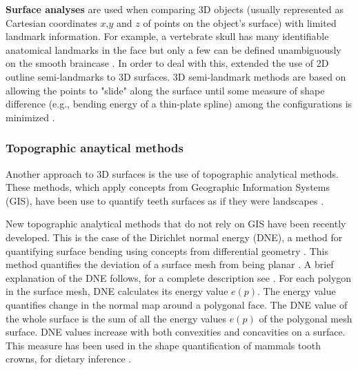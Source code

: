 \textbf{Surface analyses} are used when comparing 3D objects (usually represented as Cartesian coordinates $x$,$y$ and $z$ of points on the object's surface) with limited landmark information. For example, a vertebrate skull has many identifiable anatomical landmarks in the face but only a few can be defined unambiguously on the smooth braincase \citep{Mitteroecker2009}. In order to deal with this, \citealp{Gunz2005} extended the use of 2D outline semi-landmarks to 3D surfaces. 3D semi-landmark methods are based on allowing the points to "slide" along the surface until some measure of shape difference (e.g., bending energy of a thin-plate spline) among the configurations is minimized \citep{Mitteroecker2009}.


\subsubsection{Topographic anaytical methods}
\label{DNE_explanation}

Another approach to 3D surfaces is the use of topographic analytical methods. These methods, which apply concepts from Geographic Information Systems (GIS), have been use to quantify teeth surfaces as if they were landscapes \citep{jernvall1999laser,Winchester2014}.  

New topographic analytical methods that do not rely on GIS have been recently developed. This is the case of the Dirichlet normal energy (DNE), a method for quantifying surface bending using concepts from differential geometry \citep{Bunn2011}. This method quantifies the deviation of a surface mesh from being planar \citep{Bunn2011}. A brief explanation of the DNE follows, for a complete description see \citep{Bunn2011,Winchester2016}. For each polygon in the surface mesh, DNE calculates its energy value $e(p)$. The energy value quantifies change in the normal map around a polygonal face. The DNE value of the whole surface is the sum of all the energy values $e(p)$ of the polygonal mesh surface. DNE values increase with both convexities and concavities on a surface. This measure has been used in the shape quantification of mammals tooth crowns, for dietary inference \citep{Bunn2011}.

